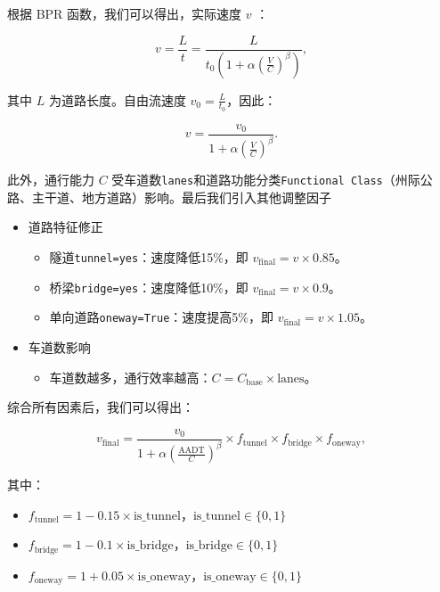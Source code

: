 \documentclass[12pt, a4paper, oneside]{ctexart}
\begin{document}
根据 BPR 函数，我们可以得出，实际速度 \(v\) ：

\begin{equation}
v = \frac{L}{t} = \frac{L}{t_0 \left(1 + \alpha \left(\frac{V}{C}\right)^\beta\right)},
\end{equation}

其中 \(L\) 为道路长度。自由流速度 \(v_0 = \frac{L}{t_0}\)，因此：

\begin{equation}
v = \frac{v_0}{1 + \alpha \left(\frac{V}{C}\right)^\beta}.
\end{equation}

此外，通行能力 \(C\) 受车道数\texttt{lanes}和道路功能分类\texttt{Functional Class}（州际公路、主干道、地方道路）影响。最后我们引入其他调整因子

\begin{itemize}
  \item 道路特征修正
    \begin{itemize}
      \item 隧道\texttt{tunnel=yes}：速度降低15\%，即 \(v_{\text{final}} = v \times 0.85\)。
      \item 桥梁\texttt{bridge=yes}：速度降低10\%，即 \(v_{\text{final}} = v \times 0.9\)。
      \item 单向道路\texttt{oneway=True}：速度提高5\%，即 \(v_{\text{final}} = v \times 1.05\)。
    \end{itemize}
  \item 车道数影响
    \begin{itemize}
      \item 车道数越多，通行效率越高：\(C = C_{\text{base}} \times \text{lanes}\)。 
    \end{itemize}
\end{itemize}

综合所有因素后，我们可以得出：

\begin{equation}
v_{\text{final}} = \frac{v_0}{1 + \alpha \left(\frac{\text{AADT}}{C}\right)^\beta} \times f_{\text{tunnel}} \times f_{\text{bridge}} \times f_{\text{oneway}},
\end{equation}

其中：

\begin{itemize}
  \item \(f_{\text{tunnel}} = 1 - 0.15 \times \text{is\_tunnel}\)，\(\text{is\_tunnel}\in\{0,1\}\)
  \item \(f_{\text{bridge}} = 1 - 0.1 \times \text{is\_bridge}\)，\(\text{is\_bridge}\in\{0,1\}\)
  \item \(f_{\text{oneway}} = 1 + 0.05 \times \text{is\_oneway}\)，\(\text{is\_oneway}\in\{0,1\}\)
\end{itemize}
\end{document}
